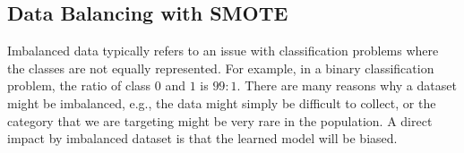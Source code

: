 
\subsection{Data Balancing with SMOTE}



Imbalanced data typically refers to an issue with classification problems where the classes are not equally represented. For example, in a binary classification problem, the ratio of class $0$ and $1$ is $99:1$. There are many reasons why a dataset might be imbalanced, e.g., the data might simply be difficult to collect, or the category that we are targeting might be very rare in the population. A direct impact by imbalanced dataset is that the learned model will be biased. 

